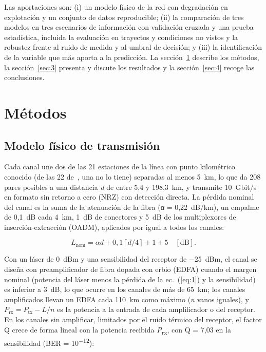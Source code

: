 \documentclass[runningheads]{llncs}
\begin{document}
Las aportaciones son: (i) un modelo físico de la red con degradación en explotación y un conjunto de datos reproducible; (ii) la comparación de tres modelos en tres escenarios de información con validación cruzada y una prueba estadística, incluida la evaluación en trayectos y condiciones no vistos y la robustez frente al ruido de medida y al umbral de decisión; y (iii) la identificación de la variable que más aporta a la predicción. La sección~\ref{sec:2} describe los métodos, la sección~\ref{sec:3} presenta y discute los resultados y la sección~\ref{sec:4} recoge las conclusiones.


\section{Métodos}\label{sec:2}


\subsection{Modelo físico de transmisión}

Cada canal une dos de las 21 estaciones de la línea con punto kilométrico conocido (de las 22 de~\cite{acosta2026tfg}, una no lo tiene) separadas al menos 5~km, lo que da 208 pares posibles a una distancia \emph{d} de entre 5,4 y 198,3~km, y transmite 10~Gbit/s en formato sin retorno a cero (NRZ) con detección directa. La pérdida nominal del canal es la suma de la atenuación de la fibra (α = 0,22~dB/km), un empalme de 0,1~dB cada 4~km, 1~dB de conectores y 5~dB de los multiplexores de inserción-extracción (OADM), aplicados por igual a todos los canales:

\begin{equation}
L_{\mathrm{nom}} = \alpha d + 0{,}1\left\lceil d/4 \right\rceil + 1 + 5 \quad [\mathrm{dB}] .
\label{eq:1}
\end{equation}

Con un láser de 0~dBm y una sensibilidad del receptor de −25~dBm, el canal se diseña con preamplificador de fibra dopada con erbio (EDFA) cuando el margen nominal (potencia del láser menos la pérdida de la ec.~(\ref{eq:1}) y la sensibilidad) es inferior a 3~dB, lo que ocurre en los canales de más de 65~km; los canales amplificados llevan un EDFA cada 110~km como máximo (\emph{n} vanos iguales), y $P_{\mathrm{rx}} = P_{\mathrm{tx}} - L/n$ es la potencia a la entrada de cada amplificador o del receptor. En los canales sin amplificar, limitados por el ruido térmico del receptor, el factor Q crece de forma lineal con la potencia recibida \emph{P}\textsubscript{rx}, con Q = 7,03 en la sensibilidad (BER = 10\textsuperscript{−12}):
\end{document}
